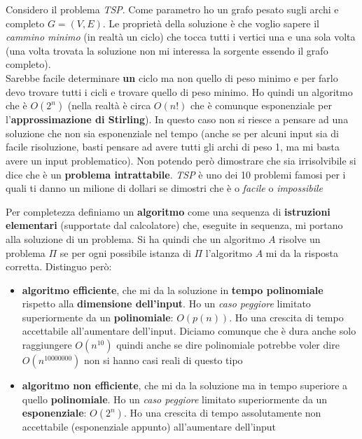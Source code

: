 \documentclass[a4paper,12pt, oneside]{book}
\begin{document}
\begin{esempio}
  Considero il problema \emph{TSP}. Come parametro ho un grafo pesato sugli
  archi e completo $G=(V,E)$. Le proprietà della soluzione è che voglio sapere
  il \emph{cammino minimo} (in realtà un ciclo) che tocca tutti i vertici una e
  una sola volta (una volta trovata la soluzione non mi interessa la sorgente
  essendo il grafo completo). \\
  Sarebbe facile determinare \textbf{un} ciclo ma non quello di peso minimo e
  per farlo devo trovare tutti i cicli e trovare quello di peso minimo. Ho
  quindi un algoritmo che è $O(2^n)$ (nella realtà è circa $O(n!)$ che è
  comunque esponenziale per l'\textbf{approssimazione di Stirling}). In questo
  caso non si riesce a pensare ad una soluzione che non sia esponenziale nel
  tempo (anche se per alcuni input sia di facile risoluzione, basti pensare ad
  avere tutti gli archi di peso 1, ma mi basta avere un input problematico). Non
  potendo però dimostrare che sia irrisolvibile si dice che è un
  \textbf{problema intrattabile}. \textit{TSP} è uno dei 10 problemi famosi per
  i quali ti danno un milione di dollari se dimostri che è o \emph{facile} o
  \emph{impossibile}
\end{esempio}
Per completezza definiamo un \textbf{algoritmo} come una sequenza di
\textbf{istruzioni elementari} (supportate dal calcolatore) che, eseguite in
sequenza, mi portano alla soluzione di un problema. Si ha quindi che un
algoritmo $A$ risolve un problema $\Pi$ se per ogni possibile istanza di $\Pi$
l'algoritmo $A$ mi da la risposta corretta. Distinguo però:
\begin{itemize}
  \item \textbf{algoritmo efficiente}, che mi da la soluzione in \textbf{tempo
    polinomiale} rispetto alla \textbf{dimensione dell'input}. Ho un
  \textit{caso peggiore} limitato superiormente da un \textbf{polinomiale}:
  $O(p(n))$. Ho una crescita di tempo accettabile all'aumentare
  dell'input. Diciamo comunque che è dura anche solo raggiungere $O(n^{10})$
  quindi anche se dire polinomiale potrebbe voler dire $O(n^{10000000})$ non si
  hanno casi reali di questo tipo
  \item \textbf{algoritmo non efficiente}, che mi da la soluzione ma in tempo
  superiore a quello \textbf{polinomiale}. Ho un \textit{caso peggiore} limitato
  superiormente da un \textbf{esponenziale}: $O(2^n)$. Ho una crescita di tempo
  assolutamente non accettabile (esponenziale appunto) all'aumentare dell'input 
\end{itemize}
\end{document}
